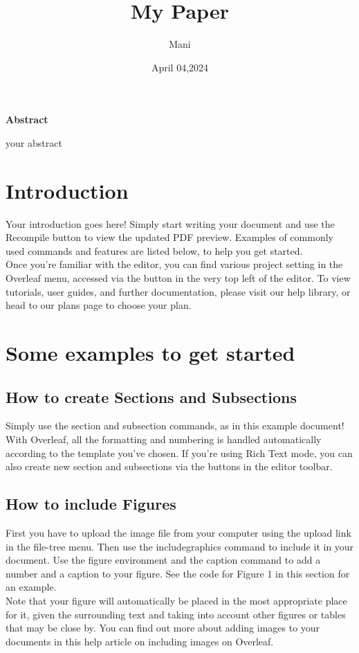 \documentclass{article}
\begin{document}
	\title{My Paper}
	\author{Mani}
	\date{April 04,2024}
	\maketitle
	\begin{center}
		\textbf{Abstract}
		
	\end{center}
 	\indent your abstract
	\section {Introduction}
	\begingroup
		Your introduction goes here! Simply start writing your document and use the Recompile button to
		view the updated PDF preview. Examples of commonly used commands and features are listed below,
		to help you get started.\\
		\indent Once you’re familiar with the editor, you can find various project setting in the Overleaf menu,
		accessed via the button in the very top left of the editor. To view tutorials, user guides, and further
		documentation, please visit our help library, or head to our plans page to choose your plan.
	\endgroup
	\section{Some examples to get started}
	\subsection{How to create Sections and Subsections}
	\begingroup
	Simply use the section and subsection commands, as in this example document! With Overleaf, all
	the formatting and numbering is handled automatically according to the template you’ve chosen. If
	you’re using Rich Text mode, you can also create new section and subsections via the buttons in the
	editor toolbar.	
		
	\endgroup
	\subsection{How to include Figures}
	\begingroup
		First you have to upload the image file from your computer using the upload link in the file-tree menu.
		Then use the includegraphics command to include it in your document. Use the figure environment
		and the caption command to add a number and a caption to your figure. See the code for Figure 1 in
		this section for an example.\\ \indent Note that your figure will automatically be placed in the most appropriate place for it, given the
		surrounding text and taking into account other figures or tables that may be close by. You can find
		out more about adding images to your documents in this help article on including images on Overleaf.
	\endgroup
\end{document}
